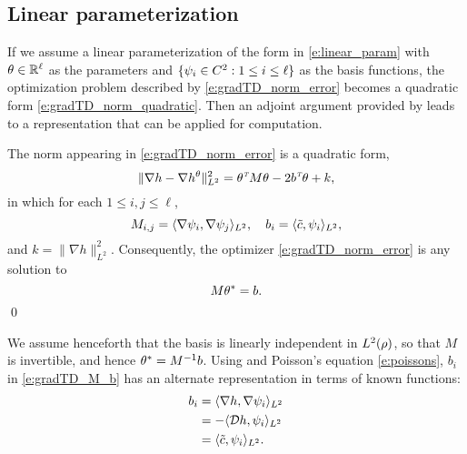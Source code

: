 \subsection{Linear parameterization}
If we assume a linear parameterization of the form in \eqref{e:linear_param} with $\theta \in \mathbb{R}^\ell$ as the parameters and $\{\psi_i \in C^2: 1\leq i \leq \ell \}$ as the basis functions, the optimization problem described by \eqref{e:gradTD_norm_error} becomes a quadratic form \eqref{e:gradTD_norm_quadratic}. Then an adjoint argument provided by  leads to a representation that can be applied for computation.  
\begin{lemma}
	\label{lemma:gradTD}
	The norm appearing in \eqref{e:gradTD_norm_error} is a quadratic form,
	\begin{equation}
	\|\nabla h - \nabla h^\param\|^2_{L^2} = \param^\transpose M \param - 2b^\transpose\param + k ,
	\label{e:gradTD_norm_quadratic}
	\end{equation}
	in which for each $1\le i, j\le \ell$,
	\begin{equation}
	M_{i,j} = \langle \gradbasis_i, \gradbasis_j \rangle_{L^2}, \quad b_i = \langle \tilc, \basis_i \rangle_{L^2},
	\label{e:gradTD_M_b}
	\end{equation}
	and $k = \| \nabla h \|^2_{L^2}$.  Consequently, the optimizer \eqref{e:gradTD_norm_error}
	is any solution to
	\begin{equation}
	M \param^* = b.
	\label{e:gradTD_theta}
	\end{equation}
	\qed
\end{lemma}

We assume henceforth  that the basis is linearly independent in $L^2(\rho)$, so that $M$ is invertible, and hence $\theta^* = M^{-1}b$. Using  and Poisson's equation \eqref{e:poissons}, $b_i$ in \eqref{e:gradTD_M_b} has an alternate representation in terms of known functions:
\begin{equation}
\begin{aligned}
b_i & = \langle \nabla h, \nabla \basis_i \rangle_{L^2} \\ 
& = - \langle \generate h, \basis_i \rangle_{L^2} \\ 
& =\langle \tilc, \basis_i \rangle_{L^2}.
\label{e:b_alt}
\end{aligned}
\end{equation}

